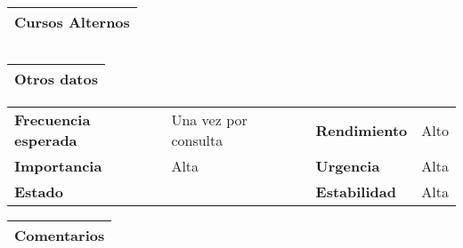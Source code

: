 \documentclass[11pt,a4paper]{article}
\begin{document}
\begin{table}[H]
	\begin{tabularx}{\textwidth}{X}
		\textbf{Cursos Alternos}\\ \hline
	\end{tabularx}
	\begin{tabularx}{\textwidth}{cX}
	\end{tabularx}
\end{table}

\begin{table}[H]
	\begin{tabularx}{\textwidth}{X}
		\textbf{Otros datos}\\ \hline
	\end{tabularx}
	\begin{tabularx}{\textwidth}{lXlX}
		\textbf{Frecuencia esperada} & Una vez por consulta & \textbf{Rendimiento} & Alto \\
		\textbf{Importancia} & Alta & \textbf{Urgencia} & Alta \\
		\textbf{Estado} &  & \textbf{Estabilidad} & Alta\\
	\end{tabularx}
	
	\begin{tabularx}{\textwidth}{X}
		\textbf{Comentarios}\\ \hline
	\end{tabularx}
\end{table}

\newpage


\end{document}
